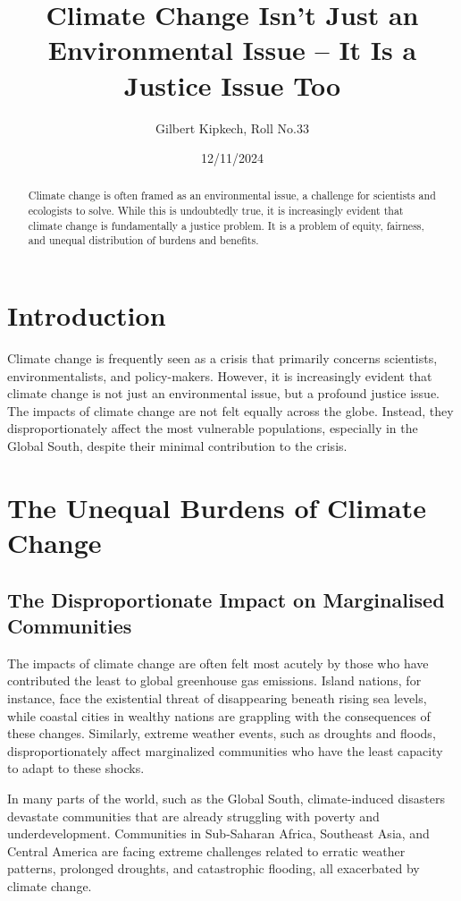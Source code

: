 \documentclass[12pt]{article}
\title{Climate Change Isn't Just an Environmental Issue -- It Is a Justice Issue Too}
\author{Gilbert Kipkech, Roll No.33}
\date{12/11/2024}
\begin{document}
\maketitle

\begin{abstract}
Climate change is often framed as an environmental issue, a challenge for scientists and ecologists to solve. While this is undoubtedly true, it is increasingly evident that climate change is fundamentally a justice problem. It is a problem of equity, fairness, and unequal distribution of burdens and benefits.
\end{abstract}

\section{Introduction}

Climate change is frequently seen as a crisis that primarily concerns scientists, environmentalists, and policy-makers. However, it is increasingly evident that climate change is not just an environmental issue, but a profound justice issue. The impacts of climate change are not felt equally across the globe. Instead, they disproportionately affect the most vulnerable populations, especially in the Global South, despite their minimal contribution to the crisis.

\section{The Unequal Burdens of Climate Change}

\subsection{The Disproportionate Impact on Marginalised Communities}

The impacts of climate change are often felt most acutely by those who have contributed the least to global greenhouse gas emissions. Island nations, for instance, face the existential threat of disappearing beneath rising sea levels, while coastal cities in wealthy nations are grappling with the consequences of these changes. Similarly, extreme weather events, such as droughts and floods, disproportionately affect marginalized communities who have the least capacity to adapt to these shocks.

In many parts of the world, such as the Global South, climate-induced disasters devastate communities that are already struggling with poverty and underdevelopment. Communities in Sub-Saharan Africa, Southeast Asia, and Central America are facing extreme challenges related to erratic weather patterns, prolonged droughts, and catastrophic flooding, all exacerbated by climate change.
\end{document}
